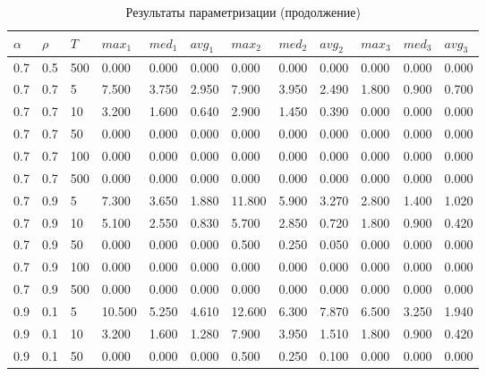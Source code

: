 \documentclass{bmstu}
\begin{document}
	\begin{longtable}{|p{}|p{}|p{}|p{}|p{}|p{}|p{}|p{}|p{}|p{}|p{}|p{}|}
	\caption{\label{tab:params3}Результаты параметризации (продолжение)} \\
	\hline
	$\alpha$ & $\rho$ & $T$ & $max_1$ & $med_1$ & $avg_1$  & $max_2$ & $med_2$ & $avg_2$  & $max_3$ & $med_3$ & $avg_3$ \\
	\hline
		0.7 & 0.5 & 500 & 0.000 & 0.000 & 0.000 & 0.000 & 0.000 & 0.000 & 0.000 & 0.000 & 0.000 \\
		\hline
		0.7 & 0.7 & 5 & 7.500 & 3.750 & 2.950 & 7.900 & 3.950 & 2.490 & 1.800 & 0.900 & 0.700 \\
		\hline
		0.7 & 0.7 & 10 & 3.200 & 1.600 & 0.640 & 2.900 & 1.450 & 0.390 & 0.000 & 0.000 & 0.000 \\
		\hline
		0.7 & 0.7 & 50 & 0.000 & 0.000 & 0.000 & 0.000 & 0.000 & 0.000 & 0.000 & 0.000 & 0.000 \\
		\hline
		0.7 & 0.7 & 100 & 0.000 & 0.000 & 0.000 & 0.000 & 0.000 & 0.000 & 0.000 & 0.000 & 0.000 \\
		\hline
		0.7 & 0.7 & 500 & 0.000 & 0.000 & 0.000 & 0.000 & 0.000 & 0.000 & 0.000 & 0.000 & 0.000 \\
		\hline
		0.7 & 0.9 & 5 & 7.300 & 3.650 & 1.880 & 11.800 & 5.900 & 3.270 & 2.800 & 1.400 & 1.020 \\
		\hline
		0.7 & 0.9 & 10 & 5.100 & 2.550 & 0.830 & 5.700 & 2.850 & 0.720 & 1.800 & 0.900 & 0.420 \\
		\hline
		0.7 & 0.9 & 50 & 0.000 & 0.000 & 0.000 & 0.500 & 0.250 & 0.050 & 0.000 & 0.000 & 0.000 \\
		\hline
		0.7 & 0.9 & 100 & 0.000 & 0.000 & 0.000 & 0.000 & 0.000 & 0.000 & 0.000 & 0.000 & 0.000 \\
		\hline
		0.7 & 0.9 & 500 & 0.000 & 0.000 & 0.000 & 0.000 & 0.000 & 0.000 & 0.000 & 0.000 & 0.000 \\
		\hline
		0.9 & 0.1 & 5 & 10.500 & 5.250 & 4.610 & 12.600 & 6.300 & 7.870 & 6.500 & 3.250 & 1.940 \\
		\hline
		0.9 & 0.1 & 10 & 3.200 & 1.600 & 1.280 & 7.900 & 3.950 & 1.510 & 1.800 & 0.900 & 0.420 \\
		\hline
		0.9 & 0.1 & 50 & 0.000 & 0.000 & 0.000 & 0.500 & 0.250 & 0.100 & 0.000 & 0.000 & 0.000 \\

\end{longtable}
\end{document}
